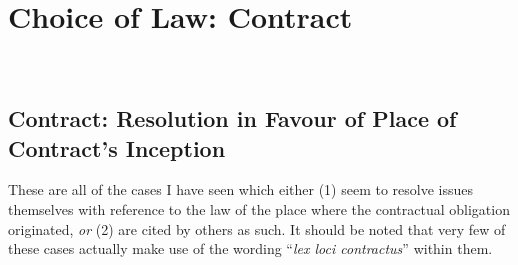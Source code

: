 \documentclass[twoside]{article}
\title{\Title}
\author{\Author}
\date{\today}
\begin{document}
\maketitle

\tableofcontents

\section{Choice of Law: Contract}\
\subsection{Contract: Resolution in Favour of Place of Contract's Inception}

These are all of the cases I have seen which either (1) seem to resolve issues themselves with reference to the law of the place where the contractual obligation originated, \textit{or} (2) are cited by others as such. It should be noted that very few of these cases actually make use of the wording “\textit{lex loci contractus}” within them.
\\ 
\end{document}
